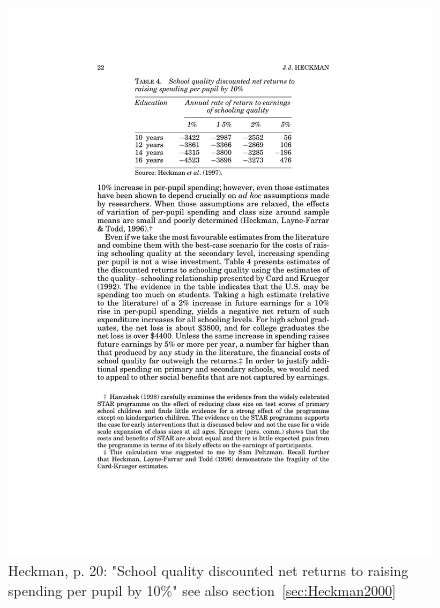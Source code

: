 \documentclass[12pt,a4paper]{article}
\begin{document}
    \begin{figure}[ht]
      \centering
      \includegraphics[width=12cm]{Meeting 10 Policies to foster human capital - Seite 20.pdf}
      \caption{Heckman, p. 20: "School quality discounted net returns to raising spending per pupil by 10\%" see also section~\ref{sec:Heckman2000}}
      \label{fig:Heckman schoolquality}
    \end{figure}
\end{document}
